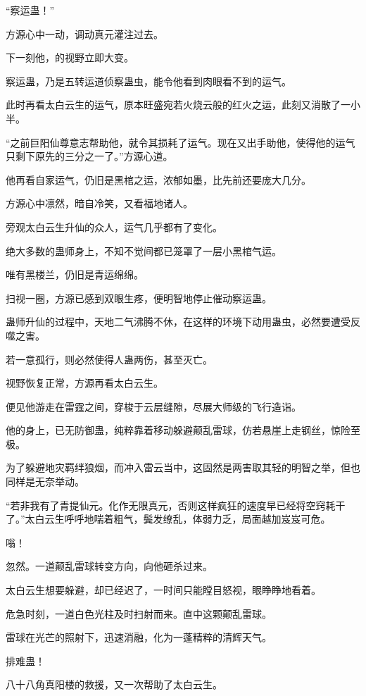 
\begin{this_body}

“察运蛊！”

方源心中一动，调动真元灌注过去。

下一刻他，的视野立即大变。

察运蛊，乃是五转运道侦察蛊虫，能令他看到肉眼看不到的运气。

此时再看太白云生的运气，原本旺盛宛若火烧云般的红火之运，此刻又消散了一小半。

“之前巨阳仙尊意志帮助他，就令其损耗了运气。现在又出手助他，使得他的运气只剩下原先的三分之一了。”方源心道。

他再看自家运气，仍旧是黑棺之运，浓郁如墨，比先前还要庞大几分。

方源心中凛然，暗自冷笑，又看福地诸人。

旁观太白云生升仙的众人，运气几乎都有了变化。

绝大多数的蛊师身上，不知不觉间都已笼罩了一层小黑棺气运。

唯有黑楼兰，仍旧是青运绵绵。

扫视一圈，方源已感到双眼生疼，便明智地停止催动察运蛊。

蛊师升仙的过程中，天地二气沸腾不休，在这样的环境下动用蛊虫，必然要遭受反噬之害。

若一意孤行，则必然使得人蛊两伤，甚至灭亡。

视野恢复正常，方源再看太白云生。

便见他游走在雷霆之间，穿梭于云层缝隙，尽展大师级的飞行造诣。

他的身上，已无防御蛊，纯粹靠着移动躲避颠乱雷球，仿若悬崖上走钢丝，惊险至极。

为了躲避地灾羁绊狼烟，而冲入雷云当中，这固然是两害取其轻的明智之举，但也同样是无奈举动。

“若非我有了青提仙元。化作无限真元，否则这样疯狂的速度早已经将空窍耗干了。”太白云生呼呼地喘着粗气，鬓发缭乱，体弱力乏，局面越加岌岌可危。

嗡！

忽然。一道颠乱雷球转变方向，向他砸杀过来。

太白云生想要躲避，却已经迟了，一时间只能瞠目怒视，眼睁睁地看着。

危急时刻，一道白色光柱及时扫射而来。直中这颗颠乱雷球。

雷球在光芒的照射下，迅速消融，化为一蓬精粹的清辉天气。

排难蛊！

八十八角真阳楼的救援，又一次帮助了太白云生。


\end{this_body}
